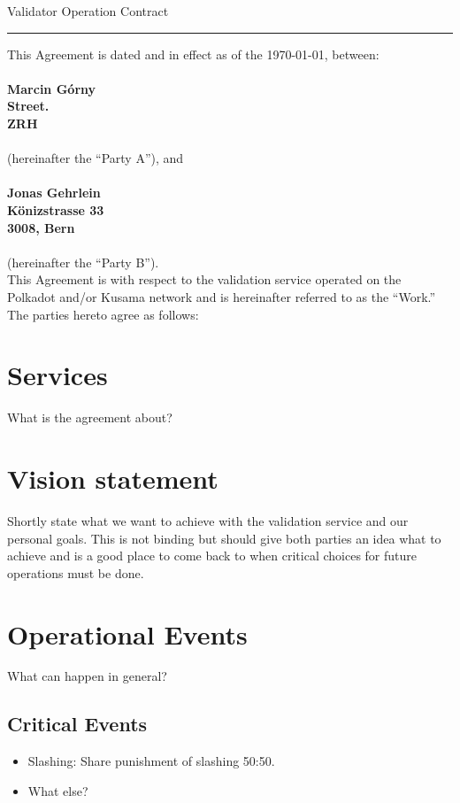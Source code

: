 \documentclass[10pt]{article}
\begin{document}
\begin{center}
{\Large Validator Operation Contract}
\end{center}

\hrule height .1mm

\vspace{.5cm}

\noindent This Agreement is dated and in effect as of the \today, between:\\
\\
{\bf Marcin Górny\\
Street.\\
ZRH\\}
\\
(hereinafter the ``Party A''), and\\
\\
{\bf Jonas Gehrlein\\
Könizstrasse 33\\
3008, Bern\\}
\\
(hereinafter the ``Party B'').  \\

This Agreement is with respect to the
validation service operated on the Polkadot and/or Kusama network and is hereinafter referred to as the
``Work.'' The parties hereto agree as follows: 


\section{Services}

What is the agreement about?


\section{Vision statement}

Shortly state what we want to achieve with the validation service and our personal goals. This is not binding but should give both parties an idea what to achieve and is a good place to come back to when critical choices for future operations must be done.

\section{Operational Events}
What can happen in general?

\subsection{Critical Events}
\begin{itemize}
    \item Slashing: Share punishment of slashing 50:50.
    \item What else?
\end{itemize}
\end{document}
